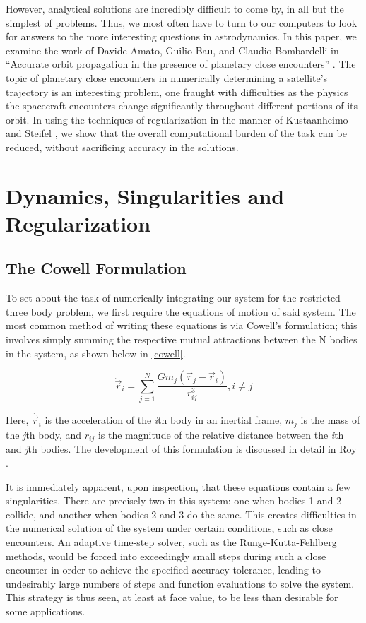 \documentclass[11pt,twoside,letterpaper]{article}
\begin{document}
    However, analytical solutions are incredibly difficult to come by,
    in all but the simplest of problems. Thus, we most often have to
    turn to our computers to look for answers to the more interesting
    questions in astrodynamics. In this paper, we examine the work of
    Davide Amato, Guilio Bau, and Claudio Bombardelli in “Accurate
    orbit propagation in the presence of planetary close encounters”
    \cite{amato_2017}. The topic of planetary close encounters in
    numerically determining a satellite’s trajectory is an interesting
    problem, one fraught with difficulties as the physics the
    spacecraft encounters change significantly throughout different
    portions of its orbit. In using the techniques of regularization
    in the manner of Kustaanheimo and Steifel \cite{stiefel_1971}, we
    show that the overall computational burden of the task can be
    reduced, without sacrificing accuracy in the solutions.
    
  \section{Dynamics, Singularities and Regularization}
  
  \subsection {The Cowell Formulation} 
  To set about the task of numerically integrating our system for the
  restricted three body problem, we first require the equations of
  motion of said system. The most common method of writing these
  equations is via Cowell's formulation; this involves simply summing
  the respective mutual attractions between the N bodies in the
  system, as shown below in \ref{cowell}. 
  
  \begin{equation} \label{cowell}
    \ddot{\vec{r}}_i = \sum_{j=1}^{N} \frac{Gm_j\left(\vec{r}_j - \vec{r}_i\right)}{r_{ij}^3} , i \neq j
  \end{equation}

  Here, \(\ddot{\vec{r}}_i\) is the acceleration of the \textit{i}th
  body in an inertial frame, \(m_j\) is the mass of the \textit{j}th
  body, and \(r_{ij}\) is the magnitude of the relative distance
  between the \textit{i}th and \textit{j}th bodies. The development of
  this formulation is discussed in detail in Roy \cite{roy_2017}.

  It is immediately apparent, upon inspection, that these equations
  contain a few singularities. There are precisely two in this system:
  one when bodies 1 and 2 collide, and another when bodies 2 and 3 do
  the same. This creates difficulties in the numerical solution of the
  system under certain conditions, such as close encounters. An
  adaptive time-step solver, such as the Runge-Kutta-Fehlberg methods,
  would be forced into exceedingly small steps during such a close
  encounter in order to achieve the specified accuracy tolerance,
  leading to undesirably large numbers of steps and function
  evaluations to solve the system. This strategy is thus seen, at
  least at face value, to be less than desirable for some
  applications.
\end{document}
